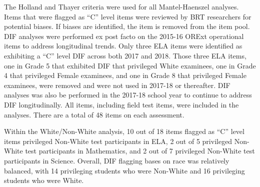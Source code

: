\documentclass[]{article}
\begin{document}
The Holland and Thayer criteria were used for all Mantel-Haenszel
analyses. Items that were flagged as ``C'' level items were reviewed by
BRT researchers for potential biases. If biases are identified, the item
is removed from the item pool. DIF analyses were performed ex post facto
on the 2015-16 ORExt operational items to address longitudinal trends.
Only three ELA items were identified as exhibiting a ``C'' level DIF
across both 2017 and 2018. Those three ELA items, one in Grade 5 that
exhibited DIF that privileged White examinees, one in Grade 4 that
privileged Female examinees, and one in Grade 8 that privileged Female
examinees, were removed and were not used in 2017-18 or thereafter. DIF
analyses was also be performed in the 2017-18 school year to continue to
address DIF longitudinally. All items, including field test items, were
included in the analyses. There are a total of 48 items on each
assessment.

Within the White/Non-White analysis, 10 out of 18 items flagged as ``C''
level items privileged Non-White test participants in ELA, 2 out of 5
privileged Non-White test participants in Mathematics, and 2 out of 7
privileged Non-White test participants in Science. Overall, DIF flagging
bases on race was relatively balanced, with 14 privileging students who
were Non-White and 16 privileging students who were White.

\FloatBarrier
\end{document}
